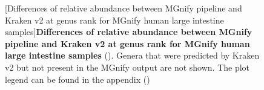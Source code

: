 \begin{figure}[H]
  \centering
  [Differences of relative abundance between MGnify pipeline and Kraken v2 at genus rank for MGnify human large intestine samples]{\textbf{Differences of relative abundance between MGnify pipeline and Kraken v2 at genus rank for MGnify human large intestine samples} (). Genera that were predicted by Kraken v2 but not present in the MGnify output are not shown. The plot legend can be found in the appendix ()} \label{fig:human_large_intestine_rel_abundance_mgnifyVSkraken2}%
\end{figure}

